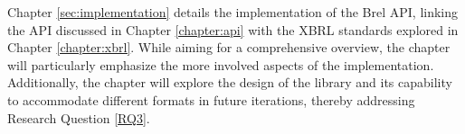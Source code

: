 Chapter \ref{sec:implementation} details the implementation of the Brel API, 
linking the API discussed in Chapter \ref{chapter:api} with the XBRL standards explored in Chapter \ref{chapter:xbrl}.
While aiming for a comprehensive overview,
the chapter will particularly emphasize the more involved aspects of the implementation.
Additionally, the chapter will explore the design of the library and its capability to accommodate different formats in future iterations, 
thereby addressing Research Question \ref{RQ3}.


